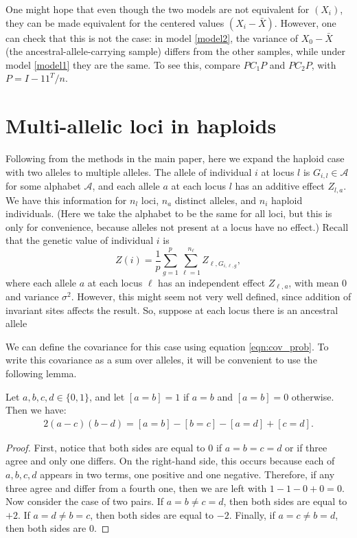 One might hope that even though the two models are not equivalent for $(X_i)$,
they can be made equivalent for the centered values $(X_i - \bar X)$.
However, one can check that this is not the case:
in model \eqref{model2}, the variance of $X_0 - \bar X$ (the ancestral-allele-carrying sample)
differs from the other samples,
while under model \eqref{model1} they are the same.
To see this, compare $PC_1P$ and $PC_2P$, with $P = I - 11^T/n$.


\section{Multi-allelic loci in haploids}
\label{sec:multiallelic}

Following from the methods in the main paper, here we expand the haploid case with two alleles to multiple alleles.
%
The allele of individual $i$ at locus $l$ is $G_{i,l} \in \mathcal{A}$
for some alphabet $\mathcal{A}$,
and each allele $a$ at each locus $l$ has an additive effect $Z_{l,a}$.
%
We have this information for
$n_l$ loci,
$n_a$ distinct alleles, and
$n_i$ haploid individuals.
(Here we take the alphabet to be the same for all loci,
but this is only for convenience,
because alleles not present at a locus have no effect.)
Recall that the genetic value of individual $i$ is
$$
Z(i) = \frac{1}{p} \sum_{g=1}^p \sum_{\ell=1}^{n_\ell} Z_{\ell,G_{i,\ell,g}} ,
$$
where each allele $a$ at each locus $\ell$ has an independent effect
$Z_{\ell,a}$, with mean 0 and variance $\sigma^2$.
However, this might seem not very well defined,
since addition of invariant sites affects the result.
So, suppose at each locus there is an ancestral allele 


We can define the covariance for this case using equation \eqref{eqn:cov_prob}.
%
To write this covariance as a sum over alleles,
it will be convenient to use the following lemma.

\begin{lemma} \label{thm:equiv}
Let $a, b, c, d \in \{0,1\}$, and let $[a=b] = 1$ if $a=b$ and $[a=b] = 0$ otherwise.
%
Then we have:
\begin{align}
    2(a-c)(b-d) = [a=b] - [b=c] - [a=d] + [c=d].
\end{align}
\end{lemma}

\begin{proof}
First, notice that both sides are equal to 0
if $a=b=c=d$ or if three agree and only one differs.
%
On the right-hand side,
this occurs because each of $a,b,c,d$ appears in two terms,
one positive and one negative.
%
Therefore, if any three agree and differ from a fourth one,
then we are left with $1 - 1 - 0 + 0 = 0$.
%
Now consider the case of two pairs.
%
If $a=b \neq c=d$, then both sides are equal to $+2$.
%
If $a=d \neq b=c$, then both sides are equal to $-2$.
%
Finally, if $a=c \neq b=d$, then both sides are 0.
\end{proof}

